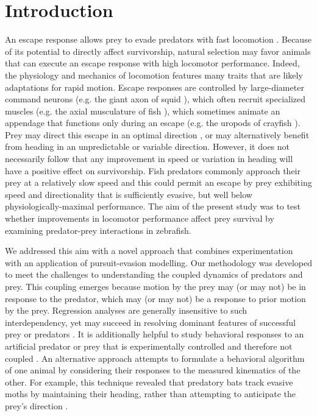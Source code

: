 \documentclass[]{rsos}%
\begin{document}
\section{Introduction}
An escape response allows prey to evade predators with fast locomotion \cite{Bullock:1984gd}.
Because of its potential to directly affect survivorship, natural selection may favor animals that can execute an escape response with high locomotor performance.
Indeed, the physiology and mechanics of locomotion features many traits that are likely adaptations for rapid motion.
Escape responses are controlled by large-diameter command neurons (e.g. the giant axon of squid \cite{YOUNG:1938vi}), which often recruit specialized muscles (e.g. the axial musculature of fish \cite{Eaton:1975ux}), which sometimes animate an appendage that functions only during an escape (e.g. the uropods of crayfish \cite{Johnson:1926cl}).
Prey may direct this escape in an optimal direction \cite{Weihs:1984tb}, or may alternatively benefit from heading in an unpredictable \cite{Humphries:1970hy} or variable \cite{Howland:1974ud} direction.
However, it does not necessarily follow that any improvement in speed or variation in heading will have a positive effect on survivorship.
Fish predators commonly approach their prey at a relatively slow speed \cite{Webb:1984jz,Higham:2007go} and this could permit an escape by prey exhibiting speed and directionality that is sufficiently evasive, but well below physiologically-maximal performance. 
The aim of the present study was to test whether improvements in locomotor performance affect prey survival by examining predator-prey interactions in zebrafish.

We addressed this aim with a novel approach that combines experimentation with an application of pursuit-evasion modelling.
Our methodology was developed to meet the challenges to understanding the coupled dynamics of predators and prey.
This coupling emerges because motion by the prey may (or may not) be in response to the predator, which may (or may not) be a response to prior motion by the prey. 
Regression analyses are generally insensitive to such interdependency, yet may succeed in resolving dominant features of successful prey \cite{Walker:2005vn} or predators \cite{Wainwright:2001ufa}.
It is additionally helpful to study behavioral responses to an artificial predator or prey that is experimentally controlled and therefore not coupled \cite{Gabbiani:1999wz,Stewart:2014cma,Heuch:2007kk,Wainwright:2001ufa,Shifferman:2004fs}.
An alternative approach attempts to formulate a behavioral algorithm of one animal by considering their responses to the measured kinematics of the other.
For example, this technique revealed that predatory bats track evasive moths by maintaining their heading, rather than attempting to anticipate the prey's direction \cite{Ghose:2006dk}. 
\end{document}
